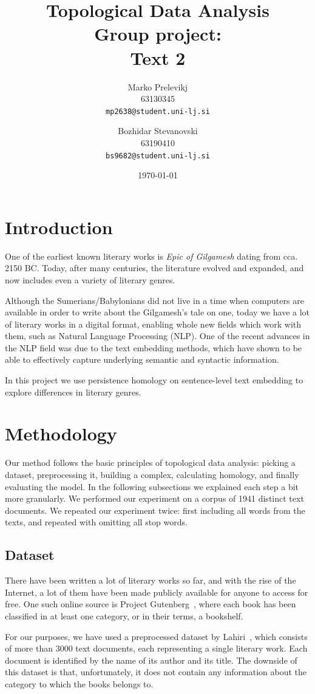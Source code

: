 \documentclass[fleqn]{article}
\title{
Topological Data Analysis \\
Group project: \\
Text 2
}
\author{
Marko Prelevikj\\
63130345\\
\texttt{mp2638@student.uni-lj.si}
\and
Bozhidar Stevanovski\\
63190410\\
\texttt{bs9682@student.uni-lj.si}
}
\date{\today}
\begin{document}
\maketitle
\section{Introduction} \label{intro}
One of the earliest known literary works is \textit{Epic of Gilgamesh} dating from cca. 2150 BC. Today, after many centuries, the literature evolved and expanded, and now includes even a variety of literary genres. 

Although the Sumerians/Babylonians did not live in a time when computers are available in order to write about the Gilgamesh's tale on one, today we have a lot of literary works in a digital format, enabling whole new fields which work with them, such as Natural Language Processing (NLP). One of the recent advances in the NLP field was due to the text embedding methods, which have shown to be able to effectively capture underlying semantic and syntactic information. 

In this project we use persistence homology on sentence-level text embedding to explore differences in literary genres.


\section{Methodology} \label{methods}
Our method follows the basic principles of topological data analysis: picking a dataset, preprocessing it, building a complex, calculating homology, and finally evaluating the model. In the following subsections we explained each step a bit more granularly. We performed our experiment on a corpus of 1941 distinct text documents. We repeated our experiment twice: first including all words from the texts, and repeated with omitting all stop words.

\subsection{Dataset} \label{dataset}
There have been written a lot of literary works so far, and with the rise of the Internet, a lot of them have been made publicly available for anyone to access for free. One such online source is Project Gutenberg~\cite{projectGutenberg}, where each book has been classified in at least one category, or in their terms, a bookshelf. 

For our purposes, we have used a preprocessed dataset by Lahiri~\cite{lahiri:2014:SRW}, which consists of more than 3000 text documents, each representing a single literary work. Each document is identified by the name of its author and its title. The downside of this dataset is that, unfortunately, it does not contain any information about the category to which the books belongs to.
\end{document}
